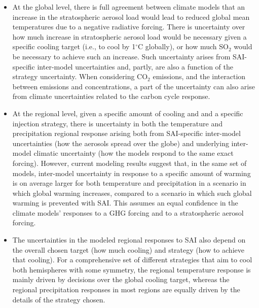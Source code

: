 \documentclass[acp, manuscript]{copernicus}
\begin{document}
\begin{itemize}
    \item At the global level, there is full agreement between climate models that an increase in the stratospheric aerosol load would lead to reduced global mean temperatures due to a negative radiative forcing. There is uncertainty over how much increase in stratospheric aerosol load would be necessary given a specific cooling target (i.e., to cool by 1$^{\circ}$C globally), or how much SO$_2$ would be necessary to achieve such an increase. Such uncertainty arises from SAI-specific inter-model uncertainties and, partly, are also a function of the strategy uncertainty. When considering CO$_2$ emissions, and the interaction between emissions and concentrations, a part of the uncertainty can also arise from climate uncertainties related to the carbon cycle response.
    \item At the regional level, given a specific amount of cooling and and a specific injection strategy, there is uncertainty in both the temperature and precipitation regional response arising both from SAI-specific inter-model uncertainties (how the aerosols spread over the globe) and underlying inter-model climatic uncertainty (how the models respond to the same exact forcing). However, current modeling results suggest that, in the same set of models, inter-model uncertainty in response to a specific amount of warming is on average larger for both temperature and precipitation in a scenario in which global warming increases, compared to a scenario in which such global warming is prevented with SAI. This assumes an equal confidence in the climate models' responses to a GHG forcing and to a stratospheric aerosol forcing.
    \item The uncertainties in the modeled regional responses to SAI also depend on the overall chosen target (how much cooling) and strategy (how to achieve that cooling). For a comprehensive set of different strategies that aim to cool both hemispheres with some symmetry, the regional temperature response is mainly driven by decisions over the global cooling target, whereas the regional precipitation responses in most regions are equally driven by the details of the strategy chosen.
\end{itemize}
\end{document}
